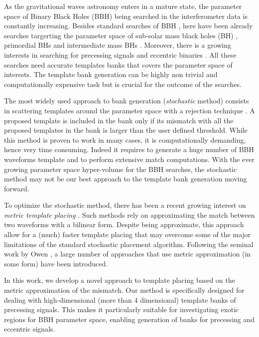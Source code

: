 \documentclass[twocolumn,showpacs,preprintnumbers,nofootinbib,prd,
superscriptaddress,10pt]{revtex4-2}
\begin{document}
As the gravitational waves astronomy enters in a mature state, the parameter space of Binary Black Holes (BBH) being searched in the interferometer data is constantly increasing. Besides standard searches of BBH \cite{GWTC-1,GWTC-2,GWTC-2.1, GWTC-3}, here have been already searches targerting the parameter space of sub-solar mass black holes (BH) \cite{SSM_O2, SSM_O3a, SSM_O3b}, primordial BHs \cite{PBH} and intermediate mass BHs \cite{IMBH_O2, IMBH_O3}. Moreover, there is a growing interests in searching for precessing signals and eccentric binaries \cite{}.
All these searches need accurate templates banks that covers the parameter space of interests. The template bank generation can be highly non trivial and computationally expensive task but is crucial for the outcome of the searches.

The most widely used approach to bank generation ({\it stochastic} method) consists in scattering templates around the parameter space with a rejection technique \cite{sbank}. A proposed template is included in the bank only if its mismatch with all the proposed templates in the bank is larger than the user defined threshold.
While this method is proven to work in many cases, it is computationally demanding, hence very time consuming. Indeed it requires to generate a huge number of BBH waveforms template and to perform extensive match computations.
With the ever growing parameter space hyper-volume for the BBH searches, the stochastic method may not be our best approach to the template bank generation moving forward.

To optimize the stochastic method, there has been a recent growing interest on {\it metric template placing} \cite{Roy:2017oul, 2018cosp...42E2899R, Coogan:2022qxs, other?}. Such methods rely on approximating the match between two waveforms with a bilinear form. Despite being approximate, this approach allow for a (much) faster template placing that may overcome some of the major limitations of the standard stochastic placement algorithm.
Following the seminal work by Owen \cite{owen_metric}, a large number of approaches that use metric approximation (in some form) have been introduced.

In this work, we develop a novel approach to template placing based on the metric approximation of the mismatch.
Our method is specifically designed for dealing with high-dimensional (more than 4 dimensional) template banks of precessing signals. This makes it particularly suitable for investigating exotic regions for BBH parameter space, enabling generation of banks for precessing and eccentric signals.
\end{document}
